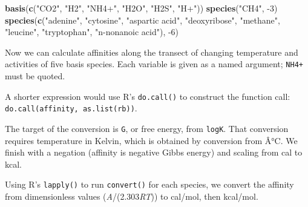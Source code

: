 \documentclass[]{tufte-handout}
\newenvironment{Shaded}{}{}
\newcommand{\KeywordTok}[1]{\textcolor[rgb]{0.00,0.44,0.13}{\textbf{#1}}}
\newcommand{\DecValTok}[1]{\textcolor[rgb]{0.25,0.63,0.44}{#1}}
\newcommand{\StringTok}[1]{\textcolor[rgb]{0.25,0.44,0.63}{#1}}
\newcommand{\OperatorTok}[1]{\textcolor[rgb]{0.40,0.40,0.40}{#1}}
\newcommand{\NormalTok}[1]{#1}
\begin{document}
\begin{Shaded}
\begin{Highlighting}[]
\KeywordTok{basis}\NormalTok{(}\KeywordTok{c}\NormalTok{(}\StringTok{"CO2"}\NormalTok{, }\StringTok{"H2"}\NormalTok{, }\StringTok{"NH4+"}\NormalTok{, }\StringTok{"H2O"}\NormalTok{, }\StringTok{"H2S"}\NormalTok{, }\StringTok{"H+"}\NormalTok{))}
\KeywordTok{species}\NormalTok{(}\StringTok{"CH4"}\NormalTok{, }\OperatorTok{-}\DecValTok{3}\NormalTok{)}
\KeywordTok{species}\NormalTok{(}\KeywordTok{c}\NormalTok{(}\StringTok{"adenine"}\NormalTok{, }\StringTok{"cytosine"}\NormalTok{, }\StringTok{"aspartic acid"}\NormalTok{, }\StringTok{"deoxyribose"}\NormalTok{,}
          \StringTok{"methane"}\NormalTok{, }\StringTok{"leucine"}\NormalTok{, }\StringTok{"tryptophan"}\NormalTok{, }\StringTok{"n-nonanoic acid"}\NormalTok{), }\OperatorTok{-}\DecValTok{6}\NormalTok{)}
\end{Highlighting}
\end{Shaded}

Now we can calculate affinities along the transect of changing
temperature and activities of five basis species. Each variable is given
as a named argument; \texttt{NH4+} must be quoted.

\begin{marginfigure}
A shorter expression would use R's \texttt{do.call()} to construct the
function call:
\texttt{do.call(}{\texttt{affinity}}\texttt{,\ as.list(rb))}.
\end{marginfigure}\begin{marginfigure}
The target of the conversion is \texttt{G}, or free energy, from
\texttt{logK}. That conversion requires temperature in Kelvin, which is
obtained by conversion from Â°C. We finish with a negation (affinity is
negative Gibbs energy) and scaling from cal to kcal.
\end{marginfigure}

Using R's \texttt{lapply()} to run {\texttt{convert()}} for each
species, we convert the affinity from dimensionless values
(\emph{A}/(2.303\emph{RT})) to cal/mol, then kcal/mol.
\end{document}
